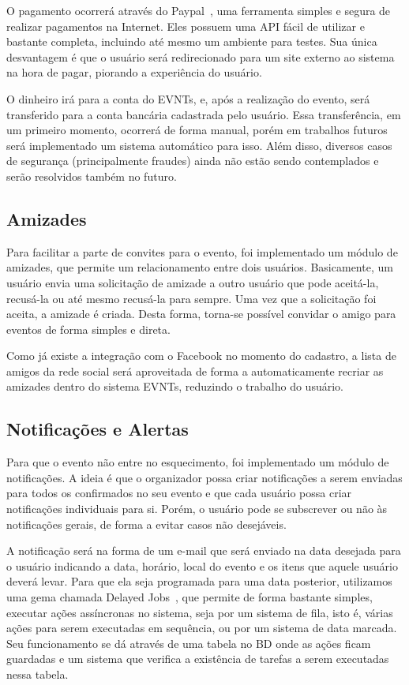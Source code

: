 O pagamento ocorrerá através do Paypal~\cite{paypal}, uma ferramenta simples e segura de realizar pagamentos na Internet. Eles possuem uma API fácil de utilizar e bastante completa, incluindo até mesmo um ambiente para testes. Sua única desvantagem é que o usuário será redirecionado para um site externo ao sistema na hora de pagar, piorando a experiência do usuário.

O dinheiro irá para a conta do EVNTs, e, após a realização do evento, será transferido para a conta bancária cadastrada pelo usuário. Essa transferência, em um primeiro momento, ocorrerá de forma manual, porém em trabalhos futuros será implementado um sistema automático para isso. Além disso, diversos casos de segurança (principalmente fraudes) ainda não estão sendo contemplados e serão resolvidos também no futuro.

\subsection{Amizades}

Para facilitar a parte de convites para o evento, foi implementado um módulo de amizades, que permite um relacionamento entre dois usuários. Basicamente, um usuário envia uma solicitação de amizade a outro usuário que pode aceitá-la, recusá-la ou até mesmo recusá-la para sempre. Uma vez que a solicitação foi aceita, a amizade é criada. Desta forma, torna-se possível convidar o amigo para eventos de forma simples e direta.

Como já existe a integração com o Facebook no momento do cadastro, a lista de amigos da rede social será aproveitada de forma a automaticamente recriar as amizades dentro do sistema EVNTs, reduzindo o trabalho do usuário.

\subsection{Notificações e Alertas}

Para que o evento não entre no esquecimento, foi implementado um módulo de notificações. A ideia é que o organizador possa criar notificações a serem enviadas para todos os confirmados no seu evento e que cada usuário possa criar notificações individuais para si. Porém, o usuário pode se subscrever ou não às notificações gerais, de forma a evitar casos não desejáveis.

A notificação será na forma de um e-mail que será enviado na data desejada para o usuário indicando a data, horário, local do evento e os itens que aquele usuário deverá levar. Para que ela seja programada para uma data posterior, utilizamos uma gema chamada Delayed Jobs~\cite{delayed_jobs}, que permite de forma bastante simples, executar ações assíncronas no sistema, seja por um sistema de fila, isto é, várias ações para serem executadas em sequência, ou por um sistema de data marcada. Seu funcionamento se dá através de uma tabela no BD onde as ações ficam guardadas e um sistema que verifica a existência de tarefas a serem executadas nessa tabela.

